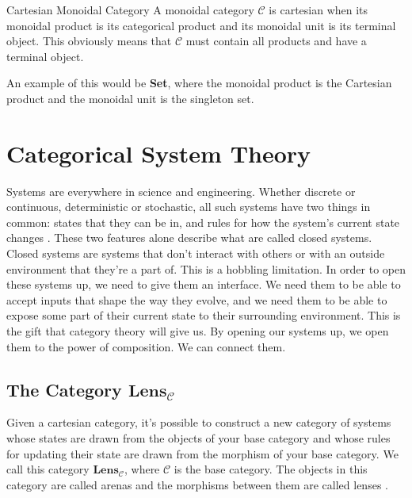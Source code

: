 \documentclass[12pt]{article}
\newcounter{examp}
\begin{document}
\begin{definition}{Cartesian Monoidal Category}{}
    A monoidal category $\mathcal{C}$ is cartesian when its monoidal product is its categorical product and its monoidal unit is its terminal object.
    This obviously means that $\mathcal{C}$ must contain all products and have a terminal object.
\end{definition}
An example of this would be \textbf{Set}, where the monoidal product is the Cartesian product and the monoidal unit is the singleton set.






\section*{Categorical System Theory}
Systems are everywhere in science and engineering.
Whether discrete or continuous, deterministic or stochastic, all such systems have two things in common: states that they can be in, and rules for how the system's current state changes \cite{myers2022categorical}.
These two features alone describe what are called closed systems.
Closed systems are systems that don't interact with others or with an outside environment that they're a part of.
This is a hobbling limitation.
In order to open these systems up, we need to give them an interface.
We need them to be able to accept inputs that shape the way they evolve, and we need them to be able to expose some part of their current state to their surrounding environment.
This is the gift that category theory will give us.
By opening our systems up, we open them to the power of composition.
We can connect them.




\subsection*{The Category $\textbf{Lens}_{\mathcal{C}}$}
Given a cartesian category, it's possible to construct a new category of systems whose states are drawn from the objects of your base category and whose rules for updating their state are drawn from the morphism of your base category.
We call this category $\textbf{Lens}_{\mathcal{C}}$, where $\mathcal{C}$ is the base category.
The objects in this category are called arenas and the morphisms between them are called lenses \cite{myers2022categorical}.
\end{document}
